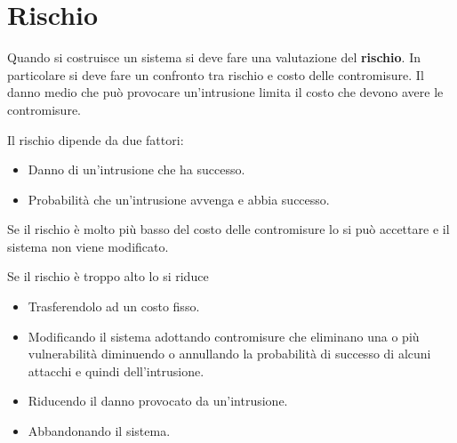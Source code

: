\section{Rischio}
Quando si costruisce un sistema si deve fare una valutazione del \textbf{rischio}. In particolare si deve fare un
confronto tra rischio e costo delle contromisure. Il danno medio che può provocare un'intrusione limita il costo che
devono avere le contromisure.

Il rischio dipende da due fattori:
\begin{itemize}
	\item Danno di un'intrusione che ha successo.
	\item Probabilità che un'intrusione avvenga e abbia successo.
\end{itemize}
Se il rischio è molto più basso del costo delle contromisure lo si può accettare e il sistema non viene modificato.

Se il rischio è troppo alto lo si riduce
\begin{itemize}
	\item Trasferendolo ad un costo fisso.
	\item Modificando il sistema adottando contromisure che eliminano una o più vulnerabilità diminuendo o annullando
	      la probabilità di successo di alcuni attacchi e quindi dell'intrusione.
	\item Riducendo il danno provocato da un'intrusione.
	\item Abbandonando il sistema.
\end{itemize}